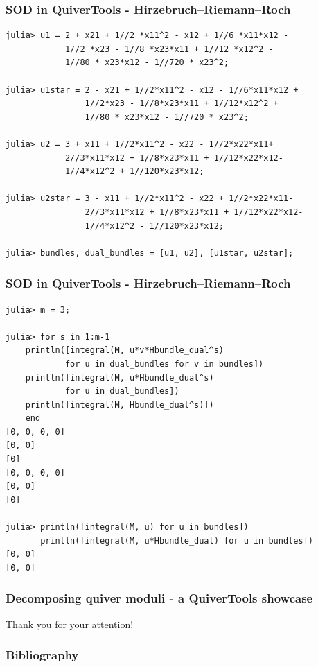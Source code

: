 \documentclass{beamer}
\begin{document}
\begin{frame}[fragile]
    \frametitle{SOD in QuiverTools - Hirzebruch--Riemann--Roch}
\scriptsize{
\begin{lstlisting}
julia> u1 = 2 + x21 + 1//2 *x11^2 - x12 + 1//6 *x11*x12 -
            1//2 *x23 - 1//8 *x23*x11 + 1//12 *x12^2 -
            1//80 * x23*x12 - 1//720 * x23^2;

julia> u1star = 2 - x21 + 1//2*x11^2 - x12 - 1//6*x11*x12 +
                1//2*x23 - 1//8*x23*x11 + 1//12*x12^2 +
                1//80 * x23*x12 - 1//720 * x23^2;

julia> u2 = 3 + x11 + 1//2*x11^2 - x22 - 1//2*x22*x11+
            2//3*x11*x12 + 1//8*x23*x11 + 1//12*x22*x12-
            1//4*x12^2 + 1//120*x23*x12;

julia> u2star = 3 - x11 + 1//2*x11^2 - x22 + 1//2*x22*x11-
                2//3*x11*x12 + 1//8*x23*x11 + 1//12*x22*x12-
                1//4*x12^2 - 1//120*x23*x12;

julia> bundles, dual_bundles = [u1, u2], [u1star, u2star];
\end{lstlisting}
}
\end{frame}

\begin{frame}[fragile]
    \frametitle{SOD in QuiverTools - Hirzebruch--Riemann--Roch}
\scriptsize{
\begin{lstlisting}
julia> m = 3;

julia> for s in 1:m-1
    println([integral(M, u*v*Hbundle_dual^s)
            for u in dual_bundles for v in bundles])
    println([integral(M, u*Hbundle_dual^s)
            for u in dual_bundles])
    println([integral(M, Hbundle_dual^s)])
    end
[0, 0, 0, 0]
[0, 0]
[0]
[0, 0, 0, 0]
[0, 0]
[0]

julia> println([integral(M, u) for u in bundles])
       println([integral(M, u*Hbundle_dual) for u in bundles])
[0, 0]
[0, 0]       
\end{lstlisting}
}
\end{frame}

\begin{frame}
    \frametitle{Decomposing quiver moduli - a QuiverTools showcase}
\begin{center}
    Thank you for your attention!
\end{center}
\end{frame}

\begin{frame}
    \frametitle{Bibliography}

\printbibliography

\end{frame}
\end{document}
